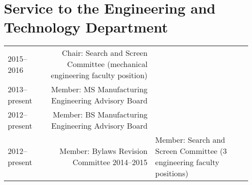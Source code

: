 \section*{Service to the Engineering and Technology Department}
\begin{tabular}{L!{\VRule}R}
2015--2016&Chair: Search and Screen Committee (mechanical engineering faculty position)\\
2013--present&Member: MS Manufacturing Engineering Advisory Board\\
2012--present&Member: BS Manufacturing Engineering Advisory Board\\
2012--present&Member: Bylaws Revision Committee
2014--2015&Member: Search and Screen Committee (3 engineering faculty positions)\\
\end{tabular}